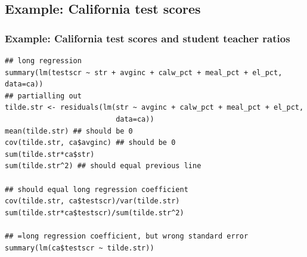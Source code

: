 \subsection{Example: California test scores}
\begin{frame}
  \frametitle{Example: California test scores and student teacher
    ratios} 
\begin{lstlisting}
## long regression
summary(lm(testscr ~ str + avginc + calw_pct + meal_pct + el_pct, data=ca))
## partialling out
tilde.str <- residuals(lm(str ~ avginc + calw_pct + meal_pct + el_pct,
                          data=ca))
mean(tilde.str) ## should be 0
cov(tilde.str, ca$avginc) ## should be 0
sum(tilde.str*ca$str) 
sum(tilde.str^2) ## should equal previous line

## should equal long regression coefficient
cov(tilde.str, ca$testscr)/var(tilde.str) 
sum(tilde.str*ca$testscr)/sum(tilde.str^2)

## =long regression coefficient, but wrong standard error
summary(lm(ca$testscr ~ tilde.str))
\end{lstlisting}  

\end{frame}


